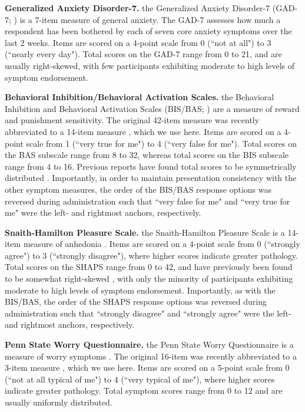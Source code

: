 \documentclass[a4paper,notitlepage,12pt]{article}
\begin{document}
\begin{refsection}[main]
\textbf{Generalized Anxiety Disorder-7.} the Generalized Anxiety Disorder-7 (GAD-7; \cite{spitzer2006brief}) is a 7-item measure of general anxiety. The GAD-7 assesses how much a respondent has been bothered by each of seven core anxiety symptoms over the last 2 weeks. Items are scored on a 4-point scale from 0 (``not at all") to 3 (``nearly every day"). Total scores on the GAD-7 range from 0 to 21, and are usually right-skewed, with few participants exhibiting moderate to high levels of symptom endorsement.

\textbf{Behavioral Inhibition/Behavioral Activation Scales.} the Behavioral Inhibition and Behavioral Activation Scales (BIS/BAS; \cite{carver1994behavioral}) are a measure of reward and punishment sensitivity. The original 42-item measure was recently abbreviated to a 14-item measure \cite{pagliaccio2016revising}, which we use here. Items are scored on a 4-point scale from 1 (``very true for me") to 4 (``very false for me"). Total scores on the BAS subscale range from 8 to 32, whereas total scores on the BIS subscale range from 4 to 16. Previous reports have found total scores to be symmetrically distributed \cite{cooper2007behavioural}. Importantly, in order to maintain presentation consistency with the other symptom measures, the order of the BIS/BAS response options was reversed during administration such that ``very false for me" and ``very true for me" were the left- and rightmost anchors, respectively. 

\textbf{Snaith-Hamilton Pleasure Scale.} the Snaith-Hamilton Pleasure Scale is a 14-item measure of anhedonia \cite{snaith1995scale}. Items are scored on a 4-point scale from 0 (``strongly agree") to 3 (``strongly disagree"), where higher scores indicate greater pathology. Total scores on the SHAPS range from 0 to 42, and have previously been found to be somewhat right-skewed \cite{franken2007assessment, leventhal2015measuring}, with only the minority of participants exhibiting moderate to high levels of symptom endorsement. Importantly, as with the BIS/BAS, the order of the SHAPS response options was reversed during administration such that ``strongly disagree" and ``strongly agree" were the left- and rightmost anchors, respectively.

\textbf{Penn State Worry Questionnaire.} the Penn State Worry Questionnaire is a measure of worry symptoms \cite{meyer1990development}. The original 16-item was recently abbreviated to a 3-item measure \cite{kertz2014psychometric}, which we use here. Items are scored on a 5-point scale from 0 (``not at all typical of me") to 4 (``very typical of me"), where higher scores indicate greater pathology. Total symptom scores range from 0 to 12 and are usually uniformly distributed.


\end{refsection}
\end{document}
